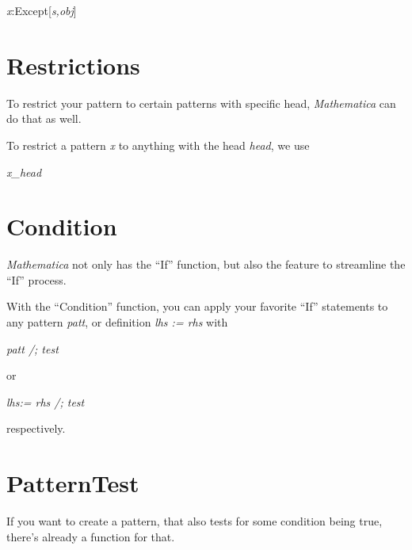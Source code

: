 \documentclass[11pt,letterpaper,twoside,titlepage]{book}
\newcommand{\Mathematica}{\textit{Mathematica} }
\begin{document}
				\begin{center}
				
					\emph{x}:Except[\emph{s,obj}]
				
				\end{center}
				
			\section{Restrictions}
			
				To restrict your pattern to certain patterns with specific head, \Mathematica can do that as well.  
				
				To restrict a pattern \emph{x} to anything with the head \emph{head}, we use
				
				\begin{center}
				
					\emph{x\_head}
				
				\end{center}
				
			\section{Condition}
			
				\Mathematica not only has the ``If'' function, but also the feature to streamline the ``If'' process.  
				
				With the ``Condition'' function, you can apply your favorite ``If'' statements to any pattern \emph{patt}, or definition \emph{lhs := rhs} with
				
				\begin{center}
				
					\emph{patt /; test}
				
				\end{center}
				
				or 
				
				\begin{center}
				
					\emph{lhs:= rhs /; test}
				
				\end{center}
				
				respectively.
				
			\section{PatternTest}
			
				If you want to create a pattern, that also tests for some condition being true, there's already a function for that.  
				
\end{document}
